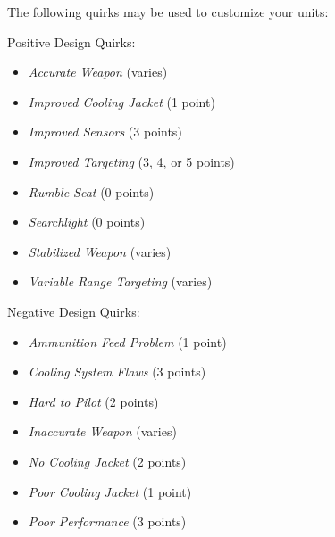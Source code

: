 \documentclass{article}
\begin{document}
\begin{itemize}
The following quirks may be used to customize your units:

Positive Design Quirks:

\begin{multicols}{2}

\begin{itemize}

\item \emph{Accurate Weapon} (varies)

\item \emph{Improved Cooling Jacket} (1 point)

\item \emph{Improved Sensors} (3 points)

\item \emph{Improved Targeting} (3, 4, or 5 points)

\item \emph{Rumble Seat} (0 points)

\item \emph{Searchlight} (0 points)

\item \emph{Stabilized Weapon} (varies)

\item \emph{Variable Range Targeting} (varies)

\end{itemize}

\end{multicols}

Negative Design Quirks:

\begin{multicols}{2}

\begin{itemize}

\item \emph{Ammunition Feed Problem} (1 point)

\item \emph{Cooling System Flaws} (3 points)

\item \emph{Hard to Pilot} (2 points)

\item \emph{Inaccurate Weapon} (varies)

\item \emph{No Cooling Jacket} (2 points)

\item \emph{Poor Cooling Jacket} (1 point)

\item \emph{Poor Performance} (3 points)


\end{itemize}
\end{multicols}
\end{itemize}
\end{document}
